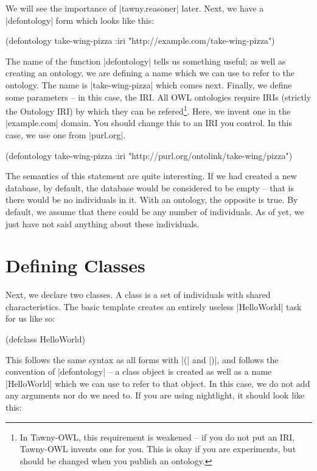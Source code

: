 We will see the importance of |tawny.reasoner| later. Next, we have a
|defontology| form which looks like this:

\begin{tawnyexample}
(defontology take-wing-pizza
  :iri "http://example.com/take-wing-pizza")
\end{tawnyexample}

The name of the function |defontology| tells us something useful; as
well as creating an ontology, we are defining a name which we can use
to refer to the ontology. The name is |take-wing-pizza| which comes
next. Finally, we define some parameters -- in this case, the IRI. All
OWL ontologies require IRIs (strictly the Ontology IRI) by which they
can be refered\footnote{In Tawny-OWL, this requirement is weakened --
  if you do not put an IRI, Tawny-OWL invents one for you. This is
  okay if you are experiments, but should be changed when you publish
  an ontology.}. Here, we invent one in the |example.com| domain. You
should change this to an IRI you control. In this case, we use one
from |purl.org|.

\begin{tawny}
(defontology take-wing-pizza
  :iri "http://purl.org/ontolink/take-wing/pizza")
\end{tawny}

The semantics of this statement are quite interesting. If we had created
a new database, by default, the database would be considered to be empty
-- that is there would be no individuals in it. With an ontology, the
opposite is true. By default, we assume that there could be any number
of individuals. As of yet, we just have not said anything about these
individuals.

\section{Defining Classes}
\label{sec:defining-classes}

Next, we declare two classes. A class is a set of individuals with
shared characteristics. The basic template creates an entirely useless
|HelloWorld| task for us like so:

\begin{tawnyexample}
(defclass HelloWorld)
\end{tawnyexample}

This follows the same syntax as all forms with |(| and |)|, and
follows the convention of |defontology| -- a class object is created
as well as a name |HelloWorld| which we can use to refer to that
object. In this case, we do not add any arguments nor do we need
to. If you are using nightlight, it should look like this:

